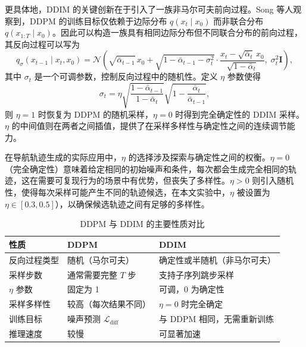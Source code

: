更具体地，DDIM 的关键创新在于引入了一族非马尔可夫前向过程。Song 等人\cite{ddim2020}观察到，DDPM 的训练目标仅依赖于边际分布 $q(x_t \mid x_0)$ 而非联合分布 $q(x_{1:T} \mid x_0)$。因此可以构造一族具有相同边际分布但不同联合分布的前向过程，其反向过程可以写为
\begin{equation}
q_\sigma(x_{t-1} \mid x_t, x_0) = \mathcal{N}\!\left(\sqrt{\bar\alpha_{t-1}}\, x_0 + \sqrt{1-\bar\alpha_{t-1}-\sigma_t^2}\cdot\frac{x_t - \sqrt{\bar\alpha_t}\, x_0}{\sqrt{1-\bar\alpha_t}},\; \sigma_t^2 \mathbf{I}\right),
\end{equation}
其中 $\sigma_t$ 是一个可调参数，控制反向过程中的随机性。定义 $\eta$ 参数使得
\begin{equation}
\sigma_t =
\eta
\sqrt{\frac{1-\bar\alpha_{t-1}}{1-\bar\alpha_t}}
\sqrt{1-\frac{\bar\alpha_t}{\bar\alpha_{t-1}}},
\end{equation}
则 $\eta = 1$ 时恢复为 DDPM 的随机采样，$\eta = 0$ 时得到完全确定性的 DDIM 采样。$\eta$ 的中间值则在两者之间插值，提供了在采样多样性与确定性之间的连续调节能力。

在导航轨迹生成的实际应用中，$\eta$ 的选择涉及探索与确定性之间的权衡。$\eta = 0$（完全确定性）意味着给定相同的初始噪声和条件，每次都会生成完全相同的轨迹，这在需要可复现行为的场景中有优势，但丧失了多样性。$\eta > 0$ 则引入随机性，使得每次采样可能产生不同的轨迹候选，在本文实验中，$\eta$ 被设置为 $\eta \in [0.3, 0.5]$），以确保候选轨迹之间有足够的多样性。

\begin{table}[htbp]
    \centering
    \caption{DDPM 与 DDIM 的主要性质对比}
    \label{tab:ddpm-ddim-compare}
    \begin{tabular}{lll}
        \toprule
        性质 & DDPM & DDIM \\
        \midrule
        反向过程类型 & 随机（马尔可夫） & 确定性或半随机（非马尔可夫） \\
        采样步数 & 通常需要完整 $T$ 步 & 支持子序列跳步采样 \\
        $\eta$ 参数 & 固定为 1 & 可调，0 为确定性 \\
        采样多样性 & 较高（每次结果不同） & $\eta=0$ 时完全确定 \\
        训练目标 & 噪声预测 $\mathcal{L}_{\text{diff}}$ & 与 DDPM 相同，无需重新训练 \\
        推理速度 & 较慢 & 可显著加速 \\
        \bottomrule
    \end{tabular}
\end{table}

